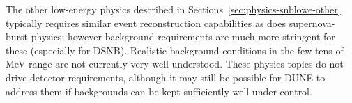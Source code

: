 



The other low-energy physics described in Sections~\ref{sec:physics-snblowe-other} typically requires similar event reconstruction capabilities as does supernova-burst physics; however background requirements are much more stringent for these (especially for DSNB).  Realistic background conditions in the few-tens-of-MeV range are not currently  very well understood.  
These physics topics do not drive detector requirements, although it may still be possible for DUNE to address them if backgrounds can be kept sufficiently well under control.
